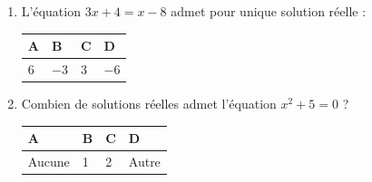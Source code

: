 \documentclass[oneside,12pt]{exam}          %
\begin{document}
\begin{enumerate}[label=\underline{Question \no\arabic*} :  , leftmargin=* , itemsep=5mm]
		

	\item L'équation $3x+4=x-8$ admet pour unique solution réelle :
	
		\hspace{\linewidth-\textwidth}
		\renewcommand{\arraystretch}{1.5}
		\begin{tabular}{| P{0.22\textwidth} | P{0.22\textwidth} | P{0.22\textwidth} | P{0.22\textwidth} |} \hline
			A & B & C & D \\ \hline
			$6$ & $-3$ & $3$ & $-6$ \\ \hline
		\end{tabular}
		
		

	\item Combien de solutions réelles admet l'équation $x^2 + 5 = 0$ ?
	
		\hspace{\linewidth-\textwidth}
		\renewcommand{\arraystretch}{1.5}
		\begin{tabular}{| P{0.22\textwidth} | P{0.22\textwidth} | P{0.22\textwidth} | P{0.22\textwidth} |} \hline
			A & B & C & D \\ \hline
			Aucune & 1 & 2 & Autre \\ \hline
		\end{tabular}	
		
\end{enumerate}
\end{document}
